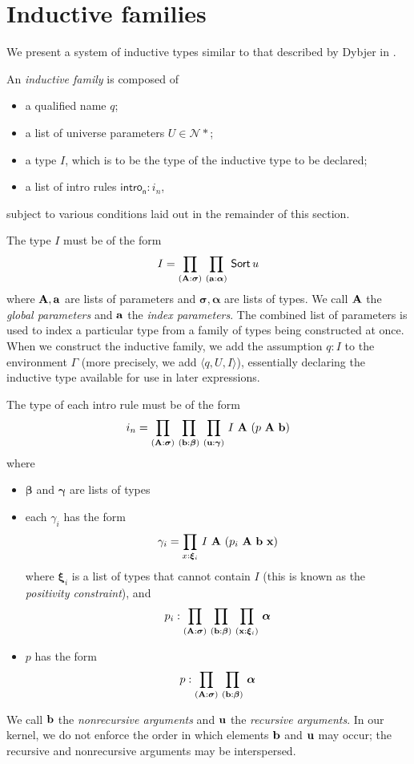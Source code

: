 \section{Inductive families}
We present a system of inductive types similar to that described by Dybjer in \cite{Dybjer1994}.
\begin{defn}
	An \textit{inductive family} is composed of
	\begin{itemize}
		\item a qualified name \( q \);
		\item a list of universe parameters \( U \in \mathcal N \ast \);
		\item a type \( I \), which is to be the type of the inductive type to be declared;
		\item a list of intro rules \( \mathsf{intro_n} : i_n \),
	\end{itemize}
	subject to various conditions laid out in the remainder of this section.
\end{defn}
The type \( I \) must be of the form
\[ I = \prd{\vb A : \bm \sigma}{\vb a : \bm \alpha} \Sort u \]
where \( \vb A, \vb a \) are lists of parameters and \( \bm \sigma, \bm \alpha \) are lists of types.
We call \( \vb A \) the \textit{global parameters} and \( \vb a \) the \textit{index parameters}.
The combined list of parameters is used to index a particular type from a family of types being constructed at once.
When we construct the inductive family, we add the assumption \( q : I \) to the environment \( \Gamma \) (more precisely, we add \( \langle q, U, I \rangle \)), essentially declaring the inductive type available for use in later expressions.

The type of each intro rule must be of the form
\[ i_n = \prd{\vb A : \bm \sigma}{\vb b : \bm \beta}{\vb u : \bm \gamma} I\ \vb A\ (p\ \vb A\ \vb b) \]
where
\begin{itemize}
	\item \( \bm \beta \) and \( \bm \gamma \) are lists of types
	\item each \( \gamma_i \) has the form
	\[ \gamma_i = \prd{x:\bm \xi_i} I\ \vb A\ (p_i\ \vb A\ \vb b\ \vb x) \]
	where \( \bm \xi_i \) is a list of types that cannot contain \( I \) (this is known as the \textit{positivity constraint}), and
	\[ p_i : \prd{\vb A : \bm \sigma}{\vb b : \bm \beta}{\vb x:\bm \xi_i} \bm \alpha \]
	\item \( p \) has the form
	\[ p : \prd{\vb A : \bm \sigma}{\vb b : \bm \beta} \bm \alpha \]
\end{itemize}
We call \( \vb b \) the \textit{nonrecursive arguments} and \( \vb u \) the \textit{recursive arguments}.
In our kernel, we do not enforce the order in which elements \( \vb b \) and \( \vb u \) may occur; the recursive and nonrecursive arguments may be interspersed.

